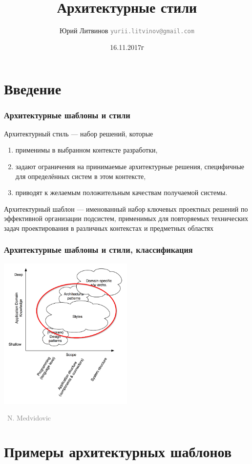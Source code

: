 \documentclass[xetex,mathserif,serif]{beamer}
\title{Архитектурные стили}
\author[Юрий Литвинов]{Юрий Литвинов \newline \textcolor{gray}{\small\texttt{yurii.litvinov@gmail.com}}}
\date{16.11.2017г}
\newcommand{\attribution}[1] {
	\vspace{-5mm}\begin{flushright}\begin{scriptsize}\textcolor{gray}{\textcopyright\, #1}\end{scriptsize}\end{flushright}
}
\begin{document}
	
	\frame{\titlepage}

	\section{Введение}

	\begin{frame}
		\frametitle{Архитектурные шаблоны и стили}
		Архитектурный стиль --- набор решений, которые
		\begin{enumerate}
			\item применимы в выбранном контексте разработки,
			\item задают ограничения на принимаемые архитектурные решения, специфичные для определённых систем в этом контексте,
			\item приводят к желаемым положительным качествам получаемой системы.
		\end{enumerate}
		Архитектурный шаблон --- именованный набор ключевых проектных решений по эффективной организации подсистем, применимых для повторяемых технических задач проектирования в различных контекстах и предметных областях
	\end{frame}

	\begin{frame}
		\frametitle{Архитектурные шаблоны и стили, классификация}
		\begin{center}
			\includegraphics[width=0.5\textwidth]{architecturalStylesHighlighted.png}
			\attribution{N. Medvidovic}
		\end{center}
	\end{frame}

	\section{Примеры архитектурных шаблонов}
\end{document}
